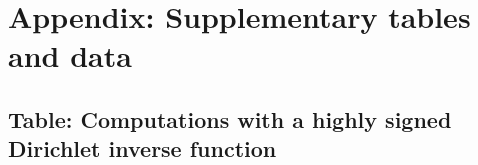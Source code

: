 \documentclass[11pt,reqno,a4letter]{article}
\numberwithin{figure}{section}
\numberwithin{table}{section}
\theoremstyle{plain}
\numberwithin{theorem}{section}
\theoremstyle{definition}
\begin{document}
\newpage 
\renewcommand{\refname}{References} 
{}


\newpage
\setcounter{section}{0} 
\renewcommand{\thesection}{\Alph{section}} 
\renewcommand{\thesubsection}{T.\arabic{subsection}} 

\section{Appendix: Supplementary tables and data} 

\newpage
\subsection{Table: Computations with a highly signed Dirichlet inverse function} 
\label{table_conjecture_Mertens_ginvSeq_approx_values}
\end{document}
